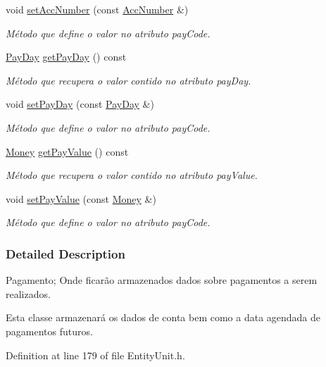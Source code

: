 \begin{DoxyCompactItemize}
void \hyperlink{classPayment_a5d0e83f83f090acf4b33bc81f5391ca0}{set\-Acc\-Number} (const \hyperlink{classAccNumber}{Acc\-Number} \&)
\begin{DoxyCompactList}\small\item\em Método que define o valor no atributo pay\-Code. \end{DoxyCompactList}\item 
\hyperlink{classPayDay}{Pay\-Day} \hyperlink{classPayment_a22ee22d04f3f5757f115386aa3337c51}{get\-Pay\-Day} () const 
\begin{DoxyCompactList}\small\item\em Método que recupera o valor contido no atributo pay\-Day. \end{DoxyCompactList}\item 
void \hyperlink{classPayment_aaadd94e11ab24629d536809da691efc5}{set\-Pay\-Day} (const \hyperlink{classPayDay}{Pay\-Day} \&)
\begin{DoxyCompactList}\small\item\em Método que define o valor no atributo pay\-Code. \end{DoxyCompactList}\item 
\hyperlink{classMoney}{Money} \hyperlink{classPayment_a3a2d6a8dc3f6b63e924504e1994ae556}{get\-Pay\-Value} () const 
\begin{DoxyCompactList}\small\item\em Método que recupera o valor contido no atributo pay\-Value. \end{DoxyCompactList}\item 
void \hyperlink{classPayment_ace63ad77804d5a19ace50aa1a7335050}{set\-Pay\-Value} (const \hyperlink{classMoney}{Money} \&)
\begin{DoxyCompactList}\small\item\em Método que define o valor no atributo pay\-Code. \end{DoxyCompactList}\end{DoxyCompactItemize}


\subsubsection{Detailed Description}
Pagamento; Onde ficarão armazenados dados sobre pagamentos a serem realizados. 

Esta classe armazenará os dados de conta bem como a data agendada de pagamentos futuros. 

Definition at line 179 of file Entity\-Unit.\-h.



